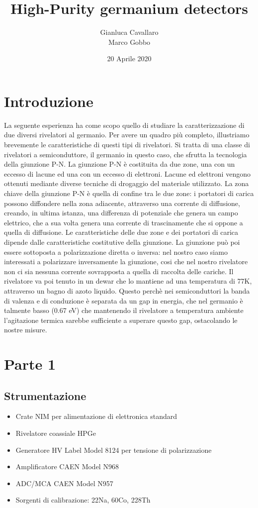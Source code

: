 \documentclass[a4paper,10pt]{article}
\title{High-Purity germanium detectors}
\author{Gianluca Cavallaro \\ Marco Gobbo}
\date{20 Aprile 2020}
\begin{document}
\maketitle
\section{Introduzione}
La seguente esperienza ha come scopo quello di studiare la caratterizzazione di due diversi rivelatori al germanio. Per avere un quadro più completo, illustriamo brevemente le caratteristiche di questi tipi di rivelatori. Si tratta di una classe di rivelatori a semiconduttore, il germanio in questo caso, che sfrutta la tecnologia della giunzione P-N. La giunzione P-N è costituita da due zone, una con un eccesso di lacune ed una con un eccesso di elettroni. Lacune ed elettroni vengono ottenuti mediante diverse tecniche di drogaggio del materiale utilizzato. La zona chiave della giunzione P-N è quella di confine tra le due zone: i portatori di carica possono diffondere nella zona adiacente, attraverso una corrente di diffusione, creando, in ultima istanza, una differenza di potenziale che genera un campo elettrico, che a sua volta genera una corrente di trascinamente che si oppone a quella di diffusione. Le caratteristiche delle due zone e dei portatori di carica dipende dalle caratteristiche costitutive della giunzione. La giunzione può poi essere sottoposta a polarizzazione diretta o inversa: nel nostro caso siamo interessati a polarizzare inversamente la giunzione, cosi che nel nostro rivelatore non ci sia nessuna corrente sovrapposta a quella di raccolta delle cariche. Il rivelatore va poi tenuto in un dewar che lo mantiene ad una temperatura di 77K, attraverso un bagno di azoto liquido. Questo perchè nei semiconduttori la banda di valenza e di conduzione è separata da un gap in energia, che nel germanio è talmente basso (0.67 eV) che mantenendo il rivelatore a temperatura ambiente l'agitazione termica sarebbe sufficiente a superare questo gap, ostacolando le nostre misure.
\section{Parte 1}
\subsection{Strumentazione}
\begin{itemize}
\item Crate NIM per alimentazione di elettronica standard
\item Rivelatore coassiale HPGe 
\item Generatore HV Label Model 8124 per tensione di polarizzazione
\item Amplificatore CAEN Model N968
\item ADC/MCA CAEN Model N957
\item Sorgenti di calibrazione: 22Na, 60Co, 228Th
\end{itemize}
\end{document}
